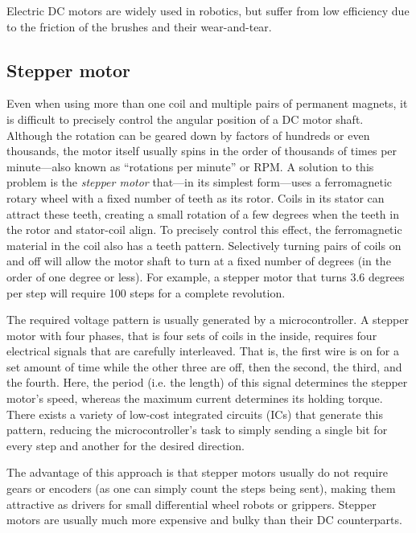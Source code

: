 Electric DC motors are widely used in robotics, but suffer from low efficiency due to the friction of the brushes and their wear-and-tear.

\subsection{Stepper motor}

Even when using more than one coil and multiple pairs of permanent magnets, it is difficult to precisely control the angular position of a DC motor shaft. Although the rotation can be geared down by factors of hundreds or even thousands, the motor itself usually spins in the order of thousands of times per minute---also known as ``rotations per minute'' or RPM.
%
A solution to this problem is the \textsl{stepper motor} that---in its simplest form---uses a ferromagnetic rotary wheel with a fixed number of teeth as its rotor. Coils in its stator can attract these teeth, creating a small rotation of a few degrees when the teeth in the rotor and stator-coil align. To precisely control this effect, the ferromagnetic material in the coil also has a teeth pattern. Selectively turning pairs of coils on and off will allow the motor shaft to turn at a fixed number of degrees (in the order of one degree or less). For example, a stepper motor that turns 3.6 degrees per step will require 100 steps for a complete revolution.

The required voltage pattern is usually generated by a microcontroller. A stepper motor with four phases, that is four sets of coils in the inside, requires four electrical signals that are carefully interleaved. That is, the first wire is on for a set amount of time while the other three are off, then the second, the third, and the fourth.
Here, the period (i.e. the length) of this signal determines the stepper motor's speed, whereas the maximum current determines its holding torque.
There exists a variety of low-cost integrated circuits (ICs) that generate this pattern, reducing the microcontroller's task to simply sending a single bit for every step and another for the desired direction.

The advantage of this approach is that stepper motors usually do not require gears or encoders (as one can simply count the steps being sent), making them attractive as drivers for small differential wheel robots or grippers. Stepper motors are usually much more expensive and bulky than their DC counterparts.

